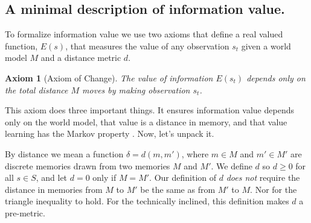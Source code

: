 \documentclass[9pt,twocolumn,twoside]{pnas-new}
\newtheorem{axiom}{Axiom}
\begin{document}


\subsection*{A minimal description of information value.}
To formalize information value we use two axioms that define a real valued function, $E(s)$, that measures the value of any observation $s_t$ given a world model $M$ and a distance metric $d$.

\begin{axiom}
    [Axiom of Change] The value of information $E(s_t)$ depends only on the total distance $M$ moves by making observation $s_t$.
\label{ax:4} \end{axiom}

\noindent This axiom does three important things. It ensures information value depends only on the world model, that value is a distance in memory, and that value learning has the Markov property \cite{Sutton2018}. Now, let's unpack it.

By distance we mean a function $\delta = d(m,m')$, where $m \in M$ and $m' \in M'$ are discrete memories drawn from two memories $M$ and $M'$. We define $d$ so $d \ge 0$ for all $s \in S$, and let $d = 0$ only if $M = M'$. Our definition of $d$ \textit{does not} require the distance in memories from $M$ to $M'$ be the same as from $M'$ to $M$. Nor for the triangle inequality to hold. For the technically inclined, this definition makes $d$ a pre-metric. 
\end{document}
